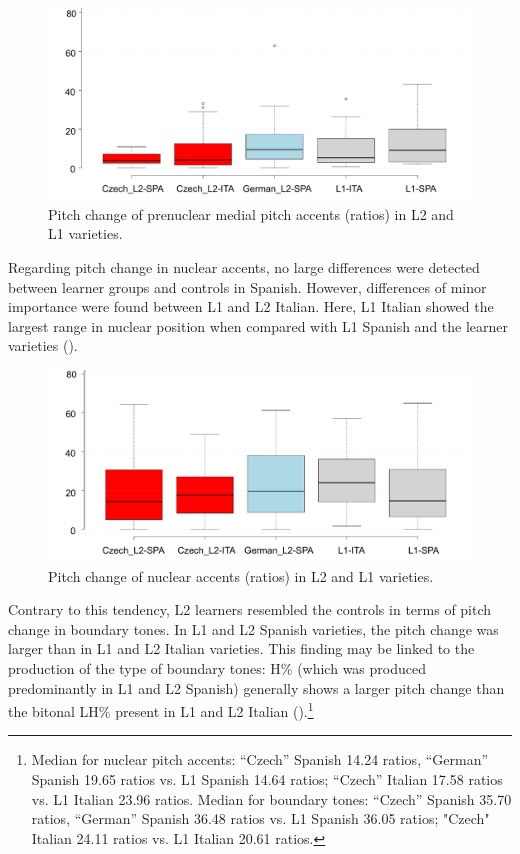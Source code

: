 \begin{figure}[p]
\includegraphics[width=\textwidth]{figures/Figure_88.pdf}
\caption{Pitch change of prenuclear medial pitch accents (ratios) in L2 and L1 varieties.}
\label{fig:4.88}
\end{figure}

Regarding pitch change in nuclear accents, no large differences were detected between learner groups and controls in Spanish. However, differences of minor importance were found between L1 and L2 Italian. Here, L1 Italian showed the largest range in nuclear position when compared with L1 Spanish and the learner varieties ().

\begin{figure}
\includegraphics[width=\textwidth]{figures/Figure_89.pdf}
\caption{Pitch change of nuclear accents (ratios) in L2 and L1 varieties.}
\label{fig:4.89}
\end{figure}

Contrary to this tendency, L2 learners resembled the controls in terms of pitch change in boundary tones. In L1 and L2 Spanish varieties, the pitch change was larger than in L1 and L2 Italian varieties. This finding may be linked to the production of the type of boundary tones: H\% (which was produced predominantly in L1 and L2 Spanish) generally shows a larger pitch change than the bitonal LH\% present in L1 and L2 Italian ().\footnote{Median for nuclear pitch accents: “Czech” Spanish 14.24 ratios, “German” Spanish 19.65 ratios vs. L1 Spanish 14.64 ratios; “Czech” Italian 17.58 ratios vs. L1 Italian 23.96 ratios. Median for boundary tones: “Czech” Spanish 35.70 ratios, “German” Spanish 36.48 ratios vs. L1 Spanish 36.05 ratios; "Czech" Italian 24.11 ratios vs. L1 Italian 20.61 ratios.}

